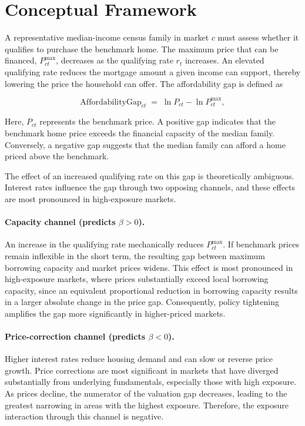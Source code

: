 \documentclass[12pt]{article}
\begin{document}
\section{Conceptual Framework}

A representative median-income census family in market $c$ must assess whether it qualifies to purchase the benchmark home. The maximum price that can be financed, $P^{\max}_{ct}$, decreases as the qualifying rate $r_t$ increases. An elevated qualifying rate reduces the mortgage amount a given income can support, thereby lowering the price the household can offer. The affordability gap is defined as


\begin{equation}
\text{AffordabilityGap}_{ct} \;=\; \ln P_{ct} - \ln P^{\max}_{ct},
\label{eq:gap}
\end{equation}

Here, $P_{ct}$ represents the benchmark price. A positive gap indicates that the benchmark home price exceeds the financial capacity of the median family. Conversely, a negative gap suggests that the median family can afford a home priced above the benchmark.

The effect of an increased qualifying rate on this gap is theoretically ambiguous. Interest rates influence the gap through two opposing channels, and these effects are most pronounced in high-exposure markets.

\paragraph{Capacity channel (predicts $\beta>0$).} An increase in the qualifying rate mechanically reduces $P^{\text{max}}_{ct}$. If benchmark prices remain inflexible in the short term, the resulting gap between maximum borrowing capacity and market prices widens. This effect is most pronounced in high-exposure markets, where prices substantially exceed local borrowing capacity, since an equivalent proportional reduction in borrowing capacity results in a larger absolute change in the price gap. Consequently, policy tightening amplifies the gap more significantly in higher-priced markets.

\paragraph{Price-correction channel (predicts $\beta<0$).} Higher interest rates reduce housing demand and can slow or reverse price growth. Price corrections are most significant in markets that have diverged substantially from underlying fundamentals, especially those with high exposure. As prices decline, the numerator of the valuation gap decreases, leading to the greatest narrowing in areas with the highest exposure. Therefore, the exposure interaction through this channel is negative.
\end{document}
